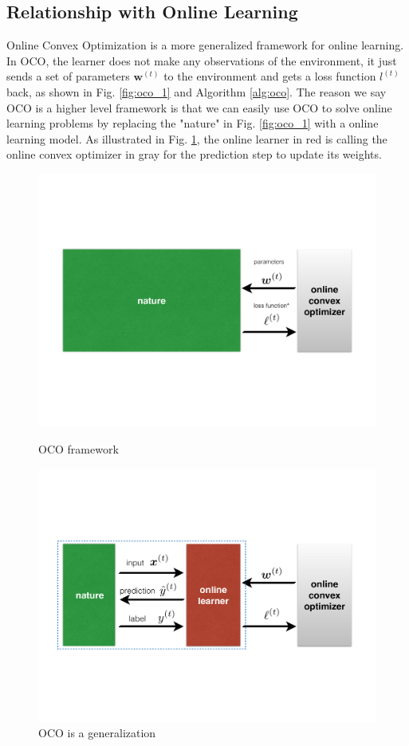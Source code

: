 \documentclass[11pt]{article}
\begin{document}
\subsection{Relationship with Online Learning}
\label{sec:rel_online_learning}
Online Convex Optimization is a more generalized framework for online learning. In OCO, the learner does not make any observations of the environment, it just sends a set of parameters $\bm{w}^{(t)}$ to the environment and gets a loss function $l^{(t)}$ back, as shown in Fig. \ref{fig:oco_1} and Algorithm \ref{alg:oco}. The reason we say OCO is a higher level framework is that we can easily use OCO to solve online learning problems by replacing the "nature" in Fig. \ref{fig:oco_1} with a online learning model. As illustrated in Fig. \ref{fig:oco_2}, the online learner in red is calling the online convex optimizer in gray for the prediction step to update its weights.

\begin{figure}[h]
\centering
\begin{minipage}{.5\textwidth}
    \centering
    \includegraphics[width=.90\linewidth]{figure/oco_1.pdf}
    \caption{OCO framework}
    \label{fig:oco_1}
\end{minipage}%
\begin{minipage}{.5\textwidth}
    \centering
    \includegraphics[width=.90\linewidth]{figure/oco_2.pdf}
    \caption{OCO is a generalization}
    \label{fig:oco_2}
\end{minipage}
\end{figure}
\end{document}
